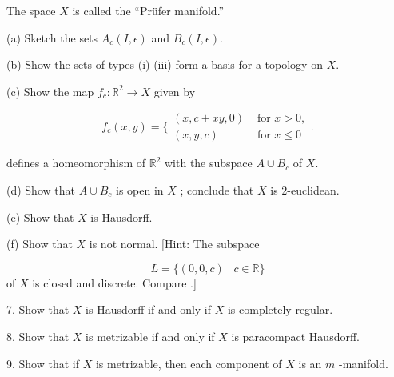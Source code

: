The space \(X\) is called the ``Prüfer manifold.''

(a) Sketch the sets \(A_{c}({I,\epsilon })\) and \(B_{c}({I,\epsilon })\).

(b) Show the sets of types (i)-(iii) form a basis for a topology on \(X\).

(c) Show the map \(f_{c} : \mathbb{R}^{2} \rightarrow X\) given by

\[
f_{c}({x,y}) = \{ \begin{array}{ll} ({x,c + {xy},0}) & \text{ for }x > 0, \\ ({x,y,c}) & \text{ for }x \leq 0 \end{array}.
\]

defines a homeomorphism of \(\mathbb{R}^{2}\) with the subspace \(A \cup {B}_{c}\) of \(X\).

(d) Show that \(A \cup {B}_{c}\) is open in \(X\) ; conclude that \(X\) is 2-euclidean.

(e) Show that \(X\) is Hausdorff.

(f) Show that \(X\) is not normal. [Hint: The subspace

\[
L = \{ ({0,0,c}) \mid c \in \mathbb{R}\}
\]
of \(X\) is closed and discrete. Compare .]

7. Show that \(X\) is Hausdorff if and only if \(X\) is completely regular.

8. Show that \(X\) is metrizable if and only if \(X\) is paracompact Hausdorff.

9. Show that if \(X\) is metrizable, then each component of \(X\) is an \(m\) -manifold.